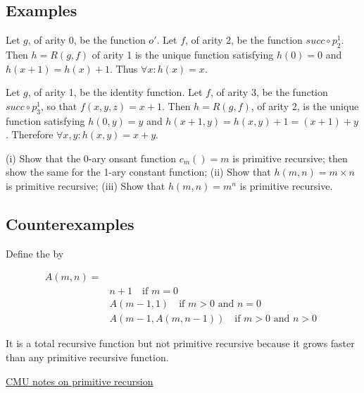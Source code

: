 \subsection{Examples}


  Let $g$, of arity 0, be the function $o'$. Let $f$, of arity 2, be the function $succ \circ p^1_2$.  Then $h = R(g,f)$ of arity 1 is the unique function satisfying $h(0) = 0$ and $h(x+1) = h(x) + 1$.  Thus $\forall x: h(x) = x$.

 Let $g$, of arity 1,  be the identity function.   Let $f$, of arity 3, be the function $succ \circ p^1_3$, so that $f(x,y,z) = x + 1$.  Then $h = R(g,f)$, of arity 2, is the unique function satisfying $h(0,y) = y$ and $h(x+1,y) = h(x,y) + 1 = (x+1) + y$.  Therefore $\forall x,y: h(x,y) = x + y$.

 (i) Show that the 0-ary onsant function $c_m() = m$ is primitive recursive; then show the same for the 1-ary constant function; (ii) Show that $h(m,n) = m\times n$ is primitive recursive; (iii) Show that $h(m,n) = m^n$ is primitive recursive.


\subsection{Counterexamples}

Define the  by


\begin{align}
A(m,n)  =& \\
               & n+ 1 \quad  \text{if $m = 0$} \\
              & A(m-1,1)  \quad \text{if $m > 0$ and $n = 0$} \\
              & A(m-1,A(m,n-1)) \quad \text{if $m > 0$ and $n > 0$} \ \ 
\end{align}

It is a total recursive function but not primitive recursive because it grows faster than any primitive recursive function.


\href{https://www.andrew.cmu.edu/user/kk3n/complearn/chapter2.pdf}{CMU notes on primitive recursion}
